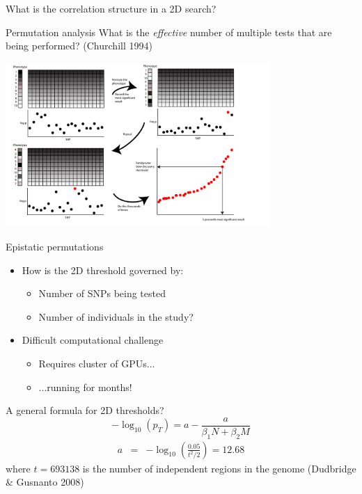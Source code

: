 \documentclass{beamer}
\begin{document}
\begin{frame}{}
\begin{center}
What is the correlation structure in a 2D search?
\end{center}
\end{frame}



\begin{frame}{Permutation analysis}
What is the \emph{effective} number of multiple tests that are being performed? (Churchill 1994)
\begin{center}
\includegraphics[width=10cm]{permutationanalysis.pdf}
\end{center}
\end{frame}


\begin{frame}{Epistatic permutations}
\begin{itemize}
\item How is the 2D threshold governed by:
\begin{itemize}
\item Number of SNPs being tested
\item Number of individuals in the study?
\end{itemize}
\item Difficult computational challenge
\begin{itemize}
\item Requires cluster of GPUs...
\item ...running for months!
\end{itemize}
\end{itemize}
\end{frame}


\begin{frame}{A general formula for 2D thresholds?}
\begin{equation}
-\log_{10}(p_{T}) = a - \frac{a}{\beta_{1} N + \beta_{2} M} \nonumber
\label{eqn:general_threshold}
\end{equation}
\begin{eqnarray}
a & = & -\log_{10} \left (\frac{0.05}{t^2/2} \right) = 12.68 \nonumber
\end{eqnarray}
where $t = 693138$ is the number of independent regions in the genome (Dudbridge \& Gusnanto 2008)
\end{frame}
\end{document}
